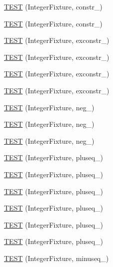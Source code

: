 \begin{DoxyCompactItemize}
\item 
\hyperlink{bmk447-TestInteger_8c_09_09_a10959f16f90ef2c23b902914a45bc8b8}{T\-E\-S\-T} (Integer\-Fixture, constr\-\_)
\item 
\hyperlink{bmk447-TestInteger_8c_09_09_ac2be55c72d93eea718cbbc93c6cd630b}{T\-E\-S\-T} (Integer\-Fixture, constr\-\_)
\item 
\hyperlink{bmk447-TestInteger_8c_09_09_a7572d20549614943acf2b206bf8c7899}{T\-E\-S\-T} (Integer\-Fixture, exconstr\-\_)
\item 
\hyperlink{bmk447-TestInteger_8c_09_09_acde7e3b3ff632f23cf3b8d633ecde05c}{T\-E\-S\-T} (Integer\-Fixture, exconstr\-\_)
\item 
\hyperlink{bmk447-TestInteger_8c_09_09_a3623d5574ec020e7fa525d049f194b1e}{T\-E\-S\-T} (Integer\-Fixture, exconstr\-\_)
\item 
\hyperlink{bmk447-TestInteger_8c_09_09_ab7662c31f8e58ee17468b69260afd20f}{T\-E\-S\-T} (Integer\-Fixture, exconstr\-\_)
\item 
\hyperlink{bmk447-TestInteger_8c_09_09_ad8a5e6617e7dd5f61983704b7fd79ea8}{T\-E\-S\-T} (Integer\-Fixture, neg\-\_)
\item 
\hyperlink{bmk447-TestInteger_8c_09_09_a0e6e1ccab25f97b2fe99457d84d05e74}{T\-E\-S\-T} (Integer\-Fixture, neg\-\_)
\item 
\hyperlink{bmk447-TestInteger_8c_09_09_ad2df86616b1f055a31f00fd24855e797}{T\-E\-S\-T} (Integer\-Fixture, neg\-\_)
\item 
\hyperlink{bmk447-TestInteger_8c_09_09_a1d062acc3d01ac8c8942481a9aceaaf9}{T\-E\-S\-T} (Integer\-Fixture, pluseq\-\_)
\item 
\hyperlink{bmk447-TestInteger_8c_09_09_ae64f794b1697a80d5b4e97b39c419b0c}{T\-E\-S\-T} (Integer\-Fixture, pluseq\-\_)
\item 
\hyperlink{bmk447-TestInteger_8c_09_09_aa78d804e31e80bc4ef7b8780ffb04180}{T\-E\-S\-T} (Integer\-Fixture, pluseq\-\_)
\item 
\hyperlink{bmk447-TestInteger_8c_09_09_ac9a105d3a52e55cf2a431d1cfb6bd258}{T\-E\-S\-T} (Integer\-Fixture, pluseq\-\_)
\item 
\hyperlink{bmk447-TestInteger_8c_09_09_a7365f06695ad37af5d01d1483c8a5196}{T\-E\-S\-T} (Integer\-Fixture, pluseq\-\_)
\item 
\hyperlink{bmk447-TestInteger_8c_09_09_ac00cba5f395d297236d512744bed85cf}{T\-E\-S\-T} (Integer\-Fixture, pluseq\-\_)
\item 
\hyperlink{bmk447-TestInteger_8c_09_09_a7c67394d2a773f6d5ec5fc67aaffd486}{T\-E\-S\-T} (Integer\-Fixture, minuseq\-\_)

\end{DoxyCompactItemize}
